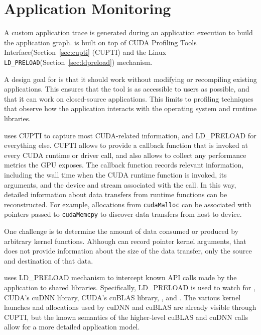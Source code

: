 \section{Application Monitoring}

A custom application trace is generated during an application execution to build the application graph.
 is built on top of CUDA Profiling Tools Interface(Section~\ref{sec:cupti} (CUPTI) and the Linux \texttt{LD\_PRELOAD}(Section~\ref{sec:ldpreload}) mechanism.

A design goal for  is that it should work without modifying or recompiling existing applications.
This ensures that the tool is as accessible to users as possible, and that it can work on closed-source applications.
This limits  to profiling techniques that observe how the application interacts with the operating system and runtime libraries.

 uses CUPTI to capture most CUDA-related information, and LD\_PRELOAD for everything else.
CUPTI allows  to provide a callback function that is invoked at every CUDA runtime or driver call, and also allows  to collect any performance metrics the GPU exposes.
The callback function records relevant information, including the wall time when the CUDA runtime function is invoked, its arguments, and the device and stream associated with the call.
In this way, detailed information about data transfers from runtime functions can be reconstructed.
For example, allocations from \texttt{cudaMalloc} can be associated with pointers passed to \texttt{cudaMemcpy} to discover data transfers from host to device.

One challenge is to determine the amount of data consumed or produced by arbitrary kernel functions.
Although  can record pointer kernel arguments, that does not provide information about the size of the data transfer, only the source and destination of that data.


 uses LD\_PRELOAD mechanism to intercept known API calls made by the application to shared libraries.
Specifically, LD\_PRELOAD is used to watch for , CUDA's cuDNN library, CUDA's cuBLAS library, , and .
The various kernel launches and allocations used by cuDNN and cuBLAS are already visible through CUPTI, but the known semantics of the higher-level cuBLAS and cuDNN calls allow for a more detailed application model.


